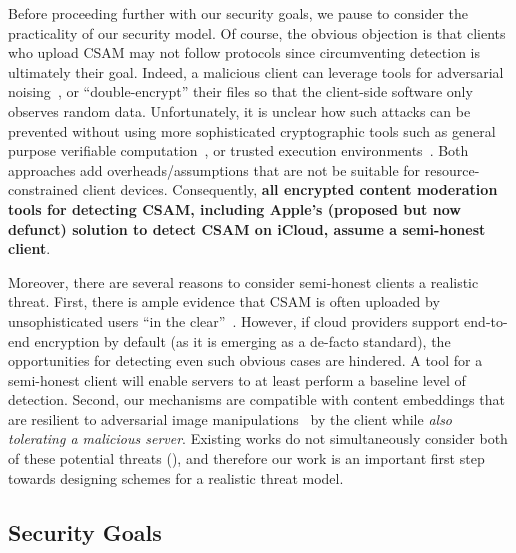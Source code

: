 \enumListEnd

%
Before proceeding further with our security goals, we pause to consider the practicality of our security model. Of course, the obvious objection is that clients who upload CSAM may not follow protocols since circumventing detection is ultimately their goal. Indeed, a malicious client can leverage tools for adversarial noising~\cite{shan2023glaze}, or ``double-encrypt'' their files so that the client-side software only observes random data. Unfortunately, it is unclear how such attacks can be prevented without using more sophisticated cryptographic tools such as general purpose verifiable computation~\cite{fiore2014efficiently}, or trusted execution environments~\cite{jauernig2020trusted}. Both approaches add overheads/assumptions that are not be suitable for resource-constrained client devices. Consequently, \textbf{all encrypted content moderation tools for detecting CSAM, including Apple's (proposed but now defunct) solution to detect CSAM on iCloud, assume a semi-honest client}.



Moreover, there are several reasons to consider semi-honest clients a realistic threat. First, there is ample evidence that CSAM is often uploaded by unsophisticated users ``in the clear''~\cite{csam_example_1,csam_example_2}. However, if cloud providers support end-to-end encryption by default (as it is emerging as a de-facto standard), the opportunities for detecting even such obvious cases are hindered. A tool for a semi-honest client will enable servers to at least perform a baseline level of detection. Second, our mechanisms are compatible with content embeddings that are resilient to adversarial image manipulations~\cite{yang2025certphash} by the client while \emph{also tolerating a malicious server}. Existing works do not simultaneously consider both of these potential threats (), 
and therefore our work is an important first step towards designing schemes for a realistic threat model.





\subsection{Security Goals}
\label{sec:security}
%


